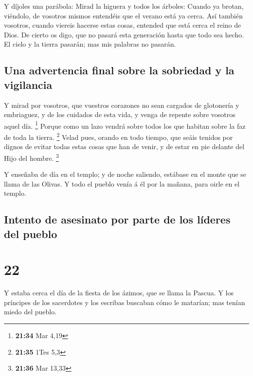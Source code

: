  Y díjoles una parábola: Mirad la higuera y todos los
árboles:  Cuando ya brotan, viéndolo, de vosotros mismos
entendéis que el verano está ya cerca.  Así también
vosotros, cuando viereis hacerse estas cosas, entended que está cerca el
reino de Dios.  De cierto os digo, que no pasará esta
generación hasta que todo sea hecho.  El cielo y la
tierra pasarán; mas mis palabras no pasarán.

\hypertarget{una-advertencia-final-sobre-la-sobriedad-y-la-vigilancia}{%
\subsection{Una advertencia final sobre la sobriedad y la
vigilancia}\label{una-advertencia-final-sobre-la-sobriedad-y-la-vigilancia}}

 Y mirad por vosotros, que vuestros corazones no sean
cargados de glotonería y embriaguez, y de los cuidados de esta vida, y
venga de repente sobre vosotros aquel día. \footnote{\textbf{21:34} Mar
  4,19}  Porque como un lazo vendrá sobre todos los que
habitan sobre la faz de toda la tierra. \footnote{\textbf{21:35} 1Tes
  5,3}  Velad pues, orando en todo tiempo, que seáis
tenidos por dignos de evitar todas estas cosas que han de venir, y de
estar en pie delante del Hijo del hombre. \footnote{\textbf{21:36} Mar
  13,33}

 Y enseñaba de día en el templo; y de noche saliendo,
estábase en el monte que se llama de las Olivas.  Y todo
el pueblo venía á él por la mañana, para oirle en el templo.

\hypertarget{intento-de-asesinato-por-parte-de-los-luxedderes-del-pueblo}{%
\subsection{Intento de asesinato por parte de los líderes del
pueblo}\label{intento-de-asesinato-por-parte-de-los-luxedderes-del-pueblo}}

\hypertarget{section-21}{%
\section{22}\label{section-21}}

 Y estaba cerca el día de la fiesta de los ázimos, que se
llama la Pascua.  Y los príncipes de los sacerdotes y los
escribas buscaban cómo le matarían; mas tenían miedo del pueblo.

